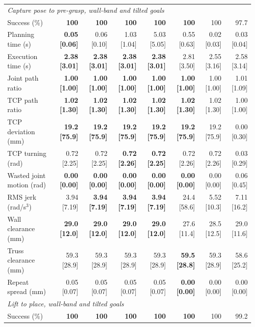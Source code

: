 \begin{table}[t]
\begin{tabular}{lrrrrrrr}
\midrule
\multicolumn{8}{l}{\emph{Capture pose to pre-grasp, wall-band and tilted goals}} \\
Success (\%) & \textbf{100} & \textbf{100} & \textbf{100} & \textbf{100} & \textbf{100} & 100 & 97.7 \\
Planning time (s) & \textbf{0.05 [0.06]} & 0.06 [0.10] & 1.03 [1.04] & 5.03 [5.05] & 0.55 [0.63] & 0.02 [0.03] & 0.03 [0.04] \\
Execution time (s) & \textbf{2.38 [3.01]} & \textbf{2.38 [3.01]} & \textbf{2.38 [3.01]} & \textbf{2.38 [3.01]} & 2.81 [3.50] & 2.55 [3.16] & 2.58 [3.14] \\
Joint path ratio & \textbf{1.00 [1.00]} & \textbf{1.00 [1.00]} & \textbf{1.00 [1.00]} & \textbf{1.00 [1.00]} & \textbf{1.00 [1.00]} & 1.00 [1.00] & 1.01 [1.09] \\
TCP path ratio & \textbf{1.02 [1.30]} & \textbf{1.02 [1.30]} & \textbf{1.02 [1.30]} & \textbf{1.02 [1.30]} & \textbf{1.02 [1.30]} & 1.02 [1.30] & 1.00 [1.00] \\
TCP deviation (mm) & \textbf{19.2 [75.9]} & \textbf{19.2 [75.9]} & \textbf{19.2 [75.9]} & \textbf{19.2 [75.9]} & \textbf{19.2 [75.9]} & 19.2 [75.9] & 0.00 [0.30] \\
TCP turning (rad) & 0.72 [2.25] & 0.72 [2.25] & \textbf{0.72 [2.26]} & \textbf{0.72 [2.25]} & 0.72 [2.26] & 0.72 [2.26] & 0.03 [0.29] \\
Wasted joint motion (rad) & \textbf{0.00 [0.00]} & \textbf{0.00 [0.00]} & \textbf{0.00 [0.00]} & \textbf{0.00 [0.00]} & \textbf{0.00 [0.00]} & 0.00 [0.00] & 0.06 [0.45] \\
RMS jerk (rad/s$^3$) & 3.94 [7.19] & \textbf{3.94 [7.19]} & \textbf{3.94 [7.19]} & \textbf{3.94 [7.19]} & 24.4 [58.6] & 5.52 [10.3] & 7.11 [16.2] \\
Wall clearance (mm) & \textbf{29.0 [12.0]} & \textbf{29.0 [12.0]} & \textbf{29.0 [12.0]} & \textbf{29.0 [12.0]} & 27.6 [11.4] & 28.5 [12.5] & 29.0 [11.6] \\
Truss clearance (mm) & 59.3 [28.9] & 59.3 [28.9] & 59.3 [28.9] & 59.3 [28.9] & \textbf{59.5 [28.8]} & 59.3 [28.9] & 58.6 [25.2] \\
Repeat spread (mm) & 0.05 [0.07] & 0.05 [0.07] & 0.05 [0.07] & 0.05 [0.07] & \textbf{0.00 [0.00]} & 0.00 [0.00] & 0.00 [0.00] \\
\midrule
\multicolumn{8}{l}{\emph{Lift to place, wall-band and tilted goals}} \\
Success (\%) & \textbf{100} & \textbf{100} & \textbf{100} & \textbf{100} & \textbf{100} & 100 & 99.2 \\

\end{tabular}
\end{table}
